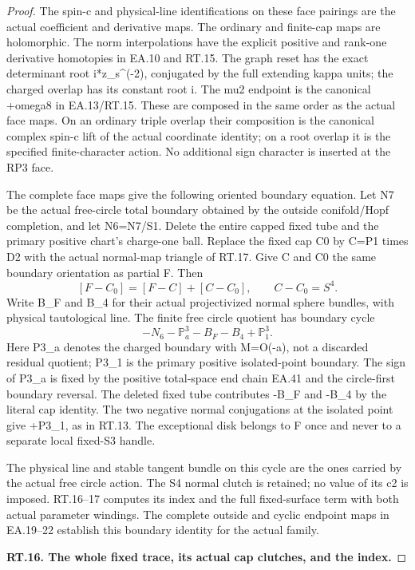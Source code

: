 \begin{proof}
The spin-c and physical-line identifications on these face
pairings are the actual coefficient and derivative maps. The
ordinary and finite-cap maps are holomorphic. The norm
interpolations have the explicit positive and rank-one derivative
homotopies in EA.10 and RT.15. The graph reset has the exact
determinant root i*z\_s\textasciicircum{}(-2), conjugated by the full extending
kappa units; the charged overlap has its constant root i.
The mu2 endpoint is the canonical +omega8 in EA.13/RT.15.
These are composed in the same order as the actual face maps.
On an ordinary triple overlap their composition is the
canonical complex spin-c lift of the actual coordinate identity;
on a root overlap it is the specified finite-character action.
No additional sign character is inserted at the RP3 face.

The complete face maps give the following oriented boundary equation.
Let N7 be the actual free-circle total boundary obtained by the
outside conifold/Hopf completion, and let N6=N7/S1. Delete the
entire capped fixed tube and the primary positive chart's
charge-one ball. Replace the fixed cap C0 by C=P1 times D2
with the actual normal-map triangle of RT.17. Give C and C0
the same boundary orientation as partial F. Then
\[
 [F-C_0]=[F-C]+[C-C_0],\qquad C-C_0=S^4.
\]
Write B\_F and B\_4 for their actual projectivized normal sphere
bundles, with physical tautological line. The finite free
circle quotient has boundary cycle
\[
       -N_6-\mathbb P^3_a-B_F-B_4+\mathbb P^3_1.
 \tag{P3K.80.EA.47}
\]
Here P3\_a denotes the charged boundary with M=O(-a), not a
discarded residual quotient; P3\_1 is the primary positive
isolated-point boundary. The sign of P3\_a is fixed by the
positive total-space end chain EA.41 and the circle-first
boundary reversal. The deleted fixed tube contributes -B\_F
and -B\_4 by the literal cap identity. The two negative normal
conjugations at the isolated point give +P3\_1, as in RT.13.
The exceptional disk belongs to F once and never to a separate
local fixed-S3 handle.

The physical line and stable tangent bundle on this cycle are
the ones carried by the actual free circle action. The S4
normal clutch is retained; no value of its c2 is imposed.
RT.16--17 computes its index and the full fixed-surface term
with both actual parameter windings. The complete outside and cyclic endpoint maps in EA.19--22 establish this boundary identity for the actual family.

\par\medskip\noindent\textbf{RT.16. The whole fixed trace, its actual cap clutches, and the index.}\par\nopagebreak[4]


\end{proof}
